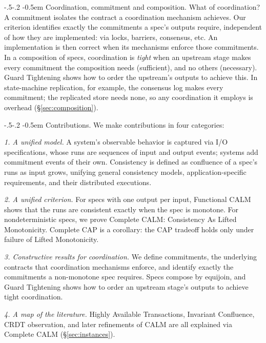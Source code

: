 \documentclass[sigconf]{cidr-2027}
\makeatletter
\theoremstyle{remark}
\renewcommand\paragraph{\@startsection{paragraph}{4}{\z@}%
  {-.5\baselineskip \@plus -2\p@ \@minus -.2\p@}%
  {-0.5em}%
  {\normalfont\bfseries}}
\newcommand{\commitment}{commitment\xspace}
\newcommand{\commitments}{commitments\xspace}
\newcommand{\spectype}[1][]{I/O specification#1\xspace}
\makeatother
\begin{document}
\paragraph{Coordination, \commitment and composition.} What of coordination?  A
\commitment isolates the contract a coordination mechanism achieves.
Our criterion identifies exactly the \commitments a spec's
outputs require, independent of
how they are implemented: via locks, barriers, consensus, etc.
An implementation is then correct when its mechanisms enforce those \commitments.
In a composition of specs,
coordination is \emph{tight} when an upstream stage makes every \commitment the
composition needs (sufficient), and no others
(necessary).  Guard Tightening shows how to order the upstream's
outputs to achieve this.  In state-machine replication, for example, the consensus
log makes every \commitment; the replicated store needs none, so any
coordination it employs is overhead (\S\ref{sec:composition}).

\paragraph{Contributions.}
We make contributions in four categories:

\noindent
\emph{1. A unified model.} A system's observable behavior is captured via
        \spectype[s], whose runs are sequences of input and output events;
        systems add \commitment events of their own. Consistency is defined as
        confluence of a spec's runs as input grows, unifying general consistency models,
        application-specific requirements, and their distributed executions.

\noindent
\emph{2. A unified criterion.} For specs with one output per input, Functional
        CALM shows that the runs are consistent exactly when the spec is monotone. For nondeterministic specs,
        we prove Complete CALM: Consistency As Lifted Monotonicity. Complete CAP is a corollary:
        the CAP tradeoff holds only under failure of Lifted Monotonicity.

\noindent
\emph{3. Constructive results for coordination.} We define \commitments, the
        underlying contracts that coordination mechanisms enforce, and
        identify exactly the \commitments a non-monotone spec requires.  Specs compose by equijoin, and Guard Tightening
        shows how to order an upstream stage's outputs to achieve tight coordination.

\noindent
\emph{4. A map of the literature.} Highly Available Transactions, Invariant
        Confluence, CRDT observation, and later refinements of CALM are all explained via Complete CALM (\S\ref{sec:instances}).
\end{document}
